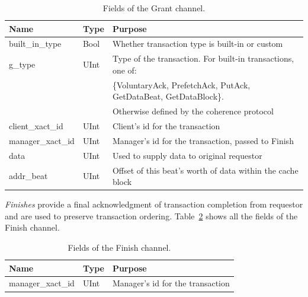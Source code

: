 
\begin{table}[]
\begin{center}
\begin{tabular}{|l|l|l|}
    \hline
    Name & Type & Purpose \\ \hline \hline
built\_in\_type & Bool & Whether transaction type is built-in or custom \\ \hline
g\_type & UInt & Type of the transaction. For built-in transactions, one of: \\
        &      & \{VoluntaryAck, PrefetchAck, PutAck, GetDataBeat, GetDataBlock\}. \\
        &      & Otherwise defined by the coherence protocol \\ \hline
client\_xact\_id & UInt & Client's id for the transaction \\ \hline
manager\_xact\_id & UInt & Manager's id for the transaction, passed to Finish \\ \hline
data & UInt & Used to supply data to original requestor \\ \hline
addr\_beat & UInt & Offset of this beat's worth of data within the cache block \\ \hline
\end{tabular}
\end{center}
\caption{Fields of the Grant channel.}
\label{tab:grant}
\end{table}



\emph{Finishes} provide a final acknowledgment of transaction completion from requestor and are used to preserve transaction ordering.
Table~\ref{tab:finish} shows all the fields of the Finish channel.

\begin{table}[]
\begin{center}
\begin{tabular}{|l|l|l|}
    \hline
    Name & Type & Purpose \\ \hline \hline
manager\_xact\_id & UInt & Manager's id for the transaction \\ \hline
\end{tabular}
\end{center}
\caption{Fields of the Finish channel.}
\label{tab:finish}
\end{table}

